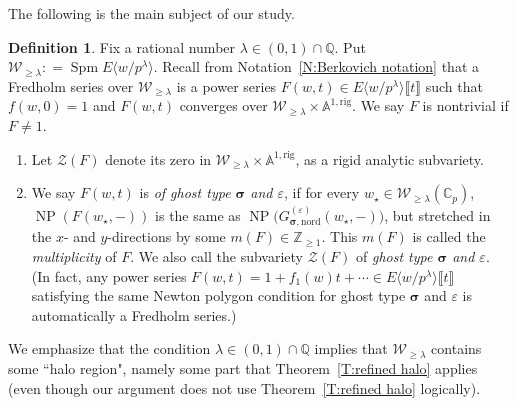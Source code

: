 \documentclass[12pt]{amsart}
\theoremstyle{definition}
\newtheorem{definition}[subsection]{Definition}
\numberwithin{equation}{subsection}
\def\calW{\mathcal{W}}
\def\calZ{\mathcal{Z}}
\def\AAA{\mathbb{A}}
\def\CC{\mathbb{C}}
\def\QQ{\mathbb{Q}}
\def\ZZ{\mathbb{Z}}
\DeclareMathOperator{\NP}{NP}
\DeclareMathOperator{\Spm}{Spm}
\newcommand{\bbsigma}{\boldsymbol{\sigma}}
\newcommand{\nord}{\mathrm{nord}}
\newcommand{\rig}{\mathrm{rig}}
\begin{document}
The following is the main subject of our study.
\begin{definition}
Fix a rational number $\lambda \in (0,1) \cap \QQ$. Put $\calW_{\geq \lambda}: = \Spm E\langle w / p^\lambda\rangle$.  Recall from Notation~\ref{N:Berkovich notation} that a Fredholm series over $\calW_{\geq \lambda}$ is a power series $F(w,t) \in E\langle w/p^\lambda\rangle \llbracket t\rrbracket$ such that $f(w,0) = 1$ and $F(w,t)$ converges over $\calW_{\geq \lambda} \times \AAA^{1,\rig}$. We say $F$ is nontrivial if $F \neq 1$.
\begin{enumerate}
\item Let $\calZ(F)$ denote its zero in $\calW_{\geq \lambda} \times \AAA^{1,\rig}$, as a rigid analytic subvariety.
\item 
We say $F(w,t)$ is \emph{of ghost type $\bbsigma$ and $\varepsilon$}, if for every $w_\star \in \calW_{\geq \lambda}(\CC_p)$, $\NP(F(w_\star, -))$ is the same as $\NP\big(G^{(\varepsilon)}_{\bbsigma, \nord}(w_\star, -)\big)$, but stretched in the $x$- and $y$-directions by some $m(F) \in \ZZ_{\geq 1}$. This $m(F)$ is called the \emph{multiplicity} of $F$. We also call the subvariety $\calZ(F)$ of \emph{ghost type $\bbsigma$ and $\varepsilon$}.
(In fact, any power series $F(w,t) = 1+f_1(w)t+ \cdots \in E\langle w/p^\lambda\rangle \llbracket t\rrbracket$ satisfying the same Newton polygon condition for ghost type $\bbsigma$ and $\varepsilon$ is automatically a Fredholm series.)
\end{enumerate}
\end{definition}
We emphasize that the condition $\lambda \in (0,1)\cap \QQ$ implies that $\calW_{\geq \lambda}$ contains some ``halo region", namely some part that Theorem~\ref{T:refined halo} applies (even though our argument does not use Theorem~\ref{T:refined halo} logically).
\end{document}
